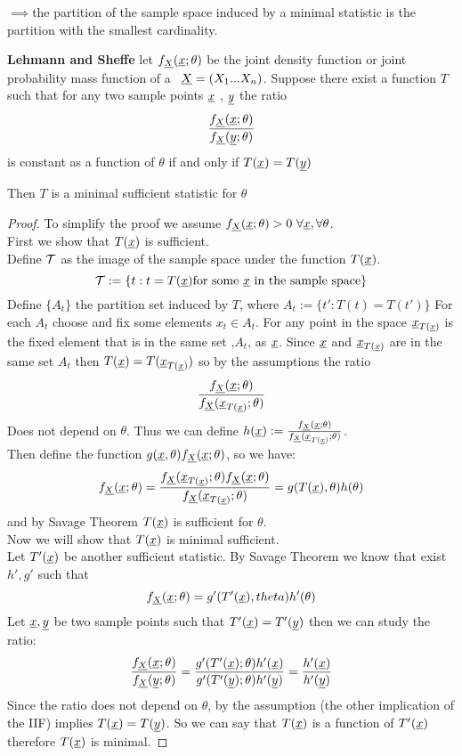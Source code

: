 $\implies$the partition of the sample space induced by a minimal statistic is the partition with the smallest cardinality.
\begin{teo}\textbf{Lehmann and Sheffe}
	let $f_{\underline X}(\underline{x};\theta)$ be the joint density function or joint probability mass function of a \rs \  $\underline X=(X_1...X_n)$. Suppose there exist a function $T$ such that for any two sample points $\underline x$ , $\underline y$ the ratio 
	\[
	\frac{f_{\underline X}(\underline{x};\theta)}{f_{\underline X}(\underline y;\theta)}
	\]
	is constant as a function of $\theta$ if and only if $T(\underline x)=T(\underline y)$
	
	
	Then $T$ is a minimal sufficient statistic for $\theta$ 
\end{teo}

\begin{proof}
	To simplify the proof we assume $f_{\underline X}(\underline{x};\theta) > 0 \ \forall \underline x, \forall \theta$.\\
	First we show that $T(\underline x)$ is sufficient.\\
	Define $\mathcal{T}$ as the image of the sample space under the function $T(\underline{x})$.
	$$\mathcal{T}:=\{ t:t=T(\underline{x}) \text{for some $\underline x$ in the sample space} \}$$
	Define $\{ A_t\} $ the partition set induced by $T$, where $A_t:=\{t' : T(t)=T(t') \}$ 
	For each $A_t$  choose and fix some elements $x_t\in A_t$. For any point in the space $\underline x_{T(\underline{x})}$ is the fixed element that is in the same set ,$A_t$, as $\underline x$. Since $\underline x$ and $\underline x_{T(\underline{x})}$ are in the same set $A_t$ then $T(\underline{x})=T(\underline x_{T(\underline{x})})$ so by the assumptions the ratio
	\[
	\frac{f_{\underline X}(\underline{x};\theta)}{f_{\underline X}(\underline x_{T(\underline{x})};\theta)}
	\]
Does not depend on $\theta$. Thus we can define $h(\underline x):=\frac{f_{\underline X}(\underline{x};\theta)}{f_{\underline X}(\underline x_{T(\underline{x})};\theta)}$.\\
Then define the function $g(\underline x,\theta)f_{\underline X}(\underline{x};\theta)$, so we have:
\[
f_{\underline X}(\underline{x};\theta) =\frac{f_{\underline X}(\underline x_{T(\underline{x})};\theta)f_{\underline X}(\underline{x};\theta)}{f_{\underline X}(\underline x_{T(\underline{x})};\theta)}=g(T(\underline x),\theta) h(\theta)
\]
and by Savage Theorem $T(\underline{x})$ is sufficient for $\theta$.\\


Now we will show that $T(\underline{x})$ is minimal sufficient.\\
Let  $T'(\underline x)$ be another sufficient statistic. By Savage Theorem we know that exist $h',g'$ such that
\[
f_{\underline X}(\underline{x};\theta)=g'(T'(\underline x),theta)h'(\theta)
\]
Let $\underline x,\underline y$ be two sample points such that $T'(\underline x)=T'(\underline y)$ then we can study the ratio:
\[
\frac{f_{\underline X}(\underline{x};\theta)}{f_{\underline X}(\underline y;\theta)}=\frac{g'(T'(\underline x);\theta)h'(\underline x)}{g'(T'(\underline y);\theta)h'(\underline y)}=\frac{h'(\underline x)}{h'(\underline y)}
\]
Since the ratio does not depend on $\theta$, by the assumption (the other implication of the IIF) implies $T(\underline{x}) =T(\underline y)$. So we can say that $T(\underline x)$ is a function of $T'(\underline x)$ therefore $T(\underline{x})$ is minimal.
\end{proof}
